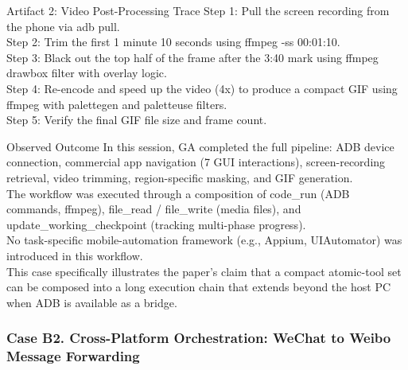 \begin{CaseTraceBox}{Artifact 2: Video Post-Processing Trace}
\small\ttfamily
Step 1: Pull the screen recording from the phone via adb pull. \\
Step 2: Trim the first 1 minute 10 seconds using ffmpeg -ss 00:01:10. \\
Step 3: Black out the top half of the frame after the 3:40 mark using ffmpeg drawbox filter with overlay logic. \\
Step 4: Re-encode and speed up the video (4x) to produce a compact GIF using ffmpeg with palettegen and paletteuse filters. \\
Step 5: Verify the final GIF file size and frame count.
\end{CaseTraceBox}

\begin{CaseAnswerBox}{Observed Outcome}
\small\ttfamily
In this session, GA completed the full pipeline: ADB device connection, commercial app navigation (7 GUI interactions), screen-recording retrieval, video trimming, region-specific masking, and GIF generation. \\
The workflow was executed through a composition of code\_run (ADB commands, ffmpeg), file\_read / file\_write (media files), and update\_working\_checkpoint (tracking multi-phase progress). \\
No task-specific mobile-automation framework (e.g., Appium, UIAutomator) was introduced in this workflow. \\
This case specifically illustrates the paper's claim that a compact atomic-tool set can be composed into a long execution chain that extends beyond the host PC when ADB is available as a bridge.
\end{CaseAnswerBox}

\FloatBarrier

\subsubsection{Case B2. Cross-Platform Orchestration: WeChat to Weibo Message Forwarding}
\label{app:case_cross_platform}

